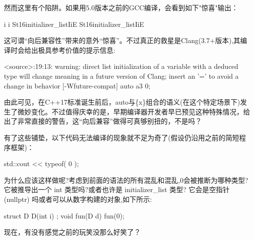 然而这里有个陷阱。如果用5.0版本之前的GCC编译，会看到如下"惊喜"输出：

\begin{shell}
i 
i
St16initializer_listIiE
St16initializer_listIiE
\end{shell}

这可谓“向后兼容性”带来的意外“惊喜”。不过真正的救星是Clang(3.7+版本),其编译时会给出极具参考价值的提示信息:

\begin{shell}
<source>:19:13: warning: direct list initialization of a variable
with a deduced type will change meaning in a future version of Clang;
insert an '=' to avoid a change in behavior [-Wfuture-compat]
  auto a3 {0};
\end{shell}

由此可见，在C++17标准诞生前后，auto与\{x\}组合的语义(在这个特定场景下)发生了微妙变化。不过值得庆幸的是，早期编译器开发者早已预见这种特殊情况，给出了非常直接的警告，这“向后兼容”做得可真够别扭的，不是吗？

有了这些铺垫，以下代码无法编译的现象就不足为奇了(假设仍沿用之前的简短程序框架)：

\begin{cpp}
std::cout << typeof( {0} );
\end{cpp}

为什么应该这样做呢?考虑到前面的语法的所有混乱和混乱,{0}会被推断为哪种类型?它被推导出一个 int 类型吗?或者也许是 initializer\_list 类型? 它会是空指针 (nullptr) 吗或者可以从数字构建的对象,如下所示:

\begin{cpp}
struct D { D(int i) {} };
void fun(D d) { }
fun({0});
\end{cpp}

现在，有没有感觉之前的玩笑没那么好笑了？








